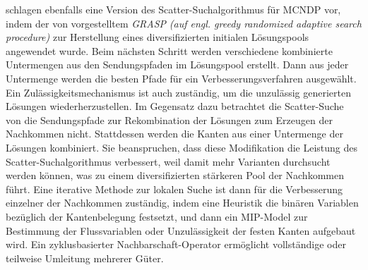 \cite{alvarez2005scatter} schlagen ebenfalls eine Version des Scatter-Suchalgorithmus für MCNDP vor, indem der von \cite{feo1995greedy} vorgestelltem \emph{GRASP} \emph{(auf engl. greedy randomized adaptive search procedure)} zur Herstellung eines diversifizierten initialen Lösungspools angewendet wurde. Beim nächsten Schritt werden verschiedene kombinierte Untermengen aus den Sendungspfaden im Lösungspool erstellt. Dann aus jeder Untermenge werden die besten Pfade für ein Verbesserungsverfahren ausgewählt. Ein Zulässigkeitsmechanismus ist auch zuständig, um die unzulässig generierten Lösungen wiederherzustellen. Im Gegensatz dazu betrachtet die Scatter-Suche von \cite{paraskevopoulos2016cycle} die Sendungspfade zur Rekombination der Lösungen zum Erzeugen der Nachkommen nicht. Stattdessen werden die Kanten aus einer Untermenge der Lösungen kombiniert. Sie beanspruchen, dass diese Modifikation die Leistung des Scatter-Suchalgorithmus verbessert, weil damit mehr Varianten durchsucht werden können, was zu einem diversifizierten stärkeren Pool der Nachkommen führt. Eine iterative Methode zur lokalen Suche ist dann für die Verbesserung einzelner der Nachkommen zuständig, indem  eine Heuristik die binären Variablen bezüglich der Kantenbelegung festsetzt, und dann ein MIP-Model zur Bestimmung der Flussvariablen oder Unzulässigkeit der festen Kanten aufgebaut wird. Ein zyklusbasierter Nachbarschaft-Operator ermöglicht vollständige oder teilweise Umleitung mehrerer Güter. 

